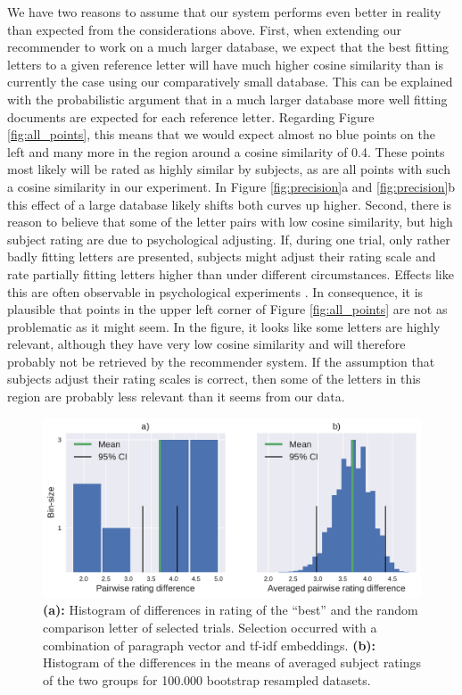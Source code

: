 We have two reasons to assume that our system performs even better in reality than expected from the considerations above. First, when extending our recommender to work on a much larger database, we expect that the best fitting letters to a given reference letter will have much higher cosine similarity than is currently the case using our comparatively small database. This can be explained with the probabilistic argument that in a much larger database more well fitting documents are expected for each reference letter. Regarding Figure \ref{fig:all_points}, this means that we would expect almost no blue points on the left and many more in the region around a cosine similarity of 0.4. These points most likely will be rated as highly similar by subjects, as are all points with such a cosine similarity in our experiment. In Figure \ref{fig:precision}a and \ref{fig:precision}b this effect of a large database likely shifts both curves up higher. Second, there is reason to believe that some of the letter pairs with low cosine similarity, but high subject rating are due to psychological adjusting. If, during one trial, only rather badly fitting letters are presented, subjects might adjust their rating scale and rate partially fitting letters higher than under different circumstances. Effects like this are often observable in psychological experiments \citep{Poulton1975}. In consequence, it is plausible that points in the upper left corner of Figure \ref{fig:all_points} are not as problematic as it might seem. In the figure, it looks like some letters are highly relevant, although they have very low cosine similarity and will therefore probably not be retrieved by the recommender system. If the assumption that subjects adjust their rating scales is correct, then some of the letters in this region are probably less relevant than it seems from our data.

\begin{figure}
	\includegraphics[width=\textwidth]{figures/both_diff_pv}
	
	\caption{\textbf{(a):} Histogram of differences in rating of the ``best'' and the random comparison letter of selected trials. Selection occurred with a combination of paragraph vector and tf-idf embeddings.
		\textbf{(b):} Histogram of the differences in the means of averaged subject ratings of the two groups for 100.000 bootstrap resampled datasets.}
	\label{fig:both_diff_pv}
\end{figure}

